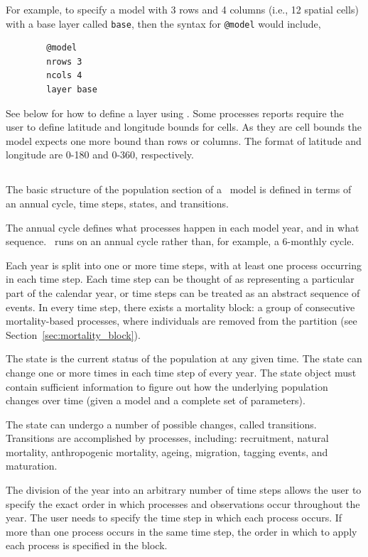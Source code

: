 For example, to specify a model with 3 rows and 4 columns (i.e., 12 spatial cells) with a base layer called \texttt{base}, then the syntax for \texttt{@model} would include,
{\small{\begin{verbatim}
		@model
		nrows 3
		ncols 4
		layer base
		\end{verbatim}}}

See below for how to define a layer using . Some processes reports require the user to define latitude and longitude bounds for cells. As they are cell bounds the model expects one more bound than rows or columns. The format of latitude and longitude are 0-180 and 0-360, respectively.


\subsection{}\label{sub:sec:pop_sec}
The basic structure of the population section of a \IBM\ model is defined in terms of an annual cycle, time steps, states, and transitions.

The annual cycle defines what processes happen in each model year, and in what sequence. \IBM\ runs on an annual cycle rather than, for example, a 6-monthly cycle.

Each year is split into one or more time steps, with at least one process occurring in each time step. Each time step can be thought of as representing a particular part of the calendar year, or time steps can be treated as an abstract sequence of events. In every time step, there exists a mortality block: a group of consecutive mortality-based processes, where individuals are removed from the partition (see Section~\ref{sec:mortality_block}).

The state is the current status of the population at any given time. The state can change one or more times in each time step of every year. The state object must contain sufficient information to figure out how the underlying population changes over time (given a model and a complete set of parameters).

The state can undergo a number of possible changes, called transitions. Transitions are accomplished by processes, including: recruitment, natural mortality, anthropogenic mortality, ageing, migration, tagging events, and maturation. 

The division of the year into an arbitrary number of time steps allows the user to specify the exact order in which processes and observations occur throughout the year. The user needs to specify the time step in which each process occurs. If more than one process occurs in the same time step, the order in which to apply each process is specified in the  block.

